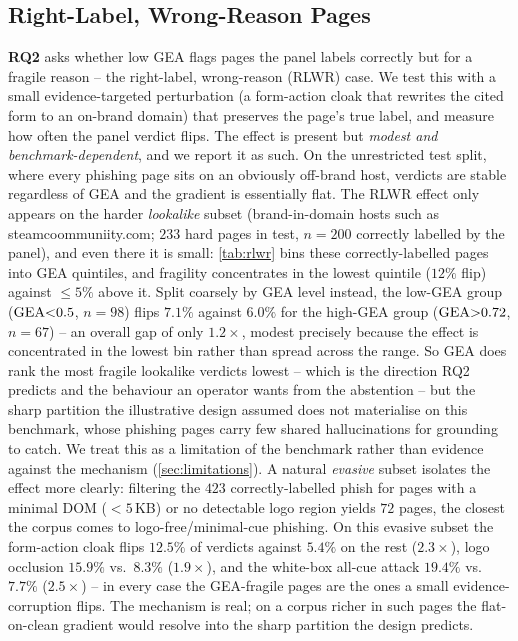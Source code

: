 \subsection{Right-Label, Wrong-Reason Pages}
\label{sec:exp_rq2}
\textbf{RQ2} asks whether low GEA flags pages the panel labels correctly but for a
fragile reason -- the right-label, wrong-reason (RLWR) case. We test this with a small
evidence-targeted perturbation (a form-action cloak that rewrites the cited form to an
on-brand domain) that preserves the page's true label, and measure how often the panel
verdict flips. The effect is present but \emph{modest and benchmark-dependent}, and we
report it as such. On the unrestricted test split, where every phishing page sits on an
obviously off-brand host, verdicts are stable regardless of GEA and the gradient is
essentially flat. The RLWR effect only appears on the harder \emph{lookalike} subset
(brand-in-domain hosts such as \textsf{steamcoommuniity.com}; $233$ hard pages in test,
$n{=}200$ correctly labelled by the panel), and even there it is small:
\autoref{tab:rlwr} bins these correctly-labelled pages into GEA quintiles, and
fragility concentrates in the lowest quintile ($12\%$ flip) against $\le5\%$ above it.
Split coarsely by GEA level instead, the low-GEA group ($\mathrm{GEA}{<}0.5$, $n{=}98$) flips
$7.1\%$ against $6.0\%$ for the high-GEA group ($\mathrm{GEA}{>}0.72$, $n{=}67$) -- an overall
gap of only $1.2\times$, modest precisely because the effect is concentrated in the lowest
bin rather than spread across the range. So GEA
does rank the most fragile lookalike verdicts lowest -- which is the direction RQ2
predicts and the behaviour an operator wants from the abstention -- but the sharp
partition the illustrative design assumed does not materialise on this benchmark, whose
phishing pages carry few shared hallucinations for grounding to catch. We treat this as
a limitation of the benchmark rather than evidence against the mechanism
(\autoref{sec:limitations}). A natural \emph{evasive} subset isolates the effect more
clearly: filtering the $423$ correctly-labelled phish for pages with a minimal DOM
($<\!5$\,KB) or no detectable logo region yields $72$ pages, the closest the corpus
comes to logo-free/minimal-cue phishing. On this evasive subset the form-action cloak
flips $12.5\%$ of verdicts against $5.4\%$ on the rest ($2.3\times$), logo occlusion
$15.9\%$ vs.\ $8.3\%$ ($1.9\times$), and the white-box all-cue attack $19.4\%$ vs.\
$7.7\%$ ($2.5\times$) -- in every case the GEA-fragile pages are the ones a small
evidence-corruption flips. The mechanism is real; on a corpus richer in such pages the
flat-on-clean gradient would resolve into the sharp partition the design predicts.


